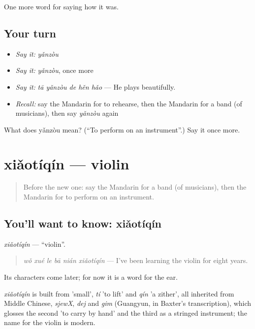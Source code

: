 \begin{grammarlens}[title={What you've built}]
One more word for saying how it was.
\end{grammarlens}

\subsection*{Your turn}
\begin{itemize}
\raggedright
  \item \emph{Say it:} \emph{yǎnzòu}
  \item \emph{Say it:} \emph{yǎnzòu}, once more
  \item \emph{Say it:} \emph{tā yǎnzòu de hěn hǎo} — He plays beautifully.
  \item \emph{Recall:} say the Mandarin for to rehearse, then the Mandarin for a band (of musicians), then say \emph{yǎnzòu} again
\end{itemize}

\begin{tcolorbox}[breakable,colback=teal!4,colframe=teal!35!black,title={Before you move on}]
What does yǎnzòu mean? (\textquotedblleft{}To perform on an instrument\textquotedblright{}.) Say it once more.
\end{tcolorbox}
\section[xiǎotíqín]{xiǎotíqín — violin}

\label{lesson:ZH-C506-xiaotiqin}



\begin{quote}
Before the new one: say the Mandarin for a band (of musicians), then the Mandarin for to perform on an instrument.
\end{quote}

\subsection*{You'll want to know: xiǎotíqín}
\emph{xiǎotíqín} — \textquotedblleft{}violin\textquotedblright{}.

\begin{quote}
\emph{wǒ xué le bā nián xiǎotíqín} — I've been learning the violin for eight years.
\end{quote}

Its characters come later; for now it is a word for the ear.

\begin{cousinweb}
\emph{xiǎotíqín} is built from  'small', \emph{tí} 'to lift' and \emph{qín} 'a zither', all inherited from Middle Chinese, \emph{sjewX}, \emph{dej} and \emph{gim} (Guangyun, in Baxter's transcription), which glosses the second 'to carry by hand' and the third as a stringed instrument; the name for the violin is modern.
\end{cousinweb}

